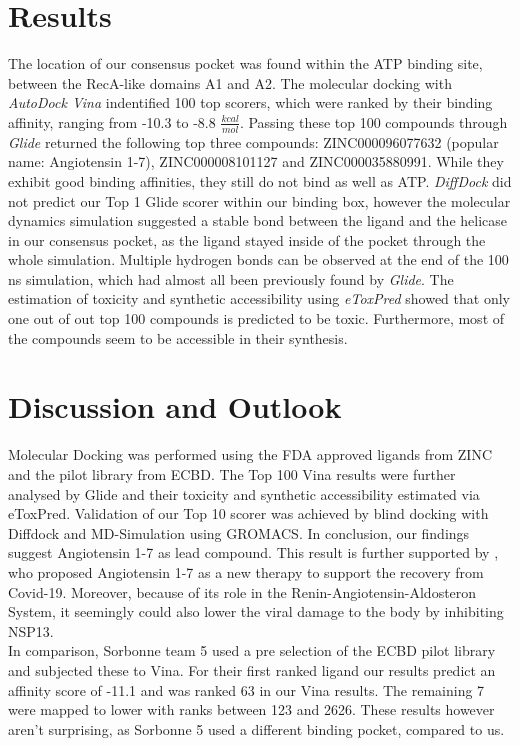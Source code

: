 \documentclass[11pt, letterpaper, titlepage]{article}
\begin{document}
\section{Results}
The location of our consensus pocket was found within the ATP binding site, between the RecA-like domains A1 and A2. The molecular docking with \textit{AutoDock Vina} indentified 100 top scorers, which were ranked by their binding affinity, ranging from -10.3 to -8.8 $\frac{kcal}{mol}$. Passing these top 100 compounds through \textit{Glide} returned the following top three compounds: ZINC000096077632 (popular name: Angiotensin 1-7), ZINC000008101127 and ZINC000035880991. While they exhibit good binding affinities, they still do not bind as well as ATP. \textit{DiffDock} did not predict our Top 1 Glide scorer within our binding box, however the molecular dynamics simulation suggested a stable bond between the ligand and the helicase in our consensus pocket, as the ligand stayed inside of the pocket through the whole simulation. Multiple hydrogen bonds can be observed at the end of the 100 ns simulation, which had almost all been previously found by \textit{Glide}. The estimation of toxicity and synthetic accessibility using \textit{eToxPred} showed that only one out of out top 100 compounds is predicted to be toxic. Furthermore, most of the compounds seem to be accessible in their synthesis.

\FloatBarrier

\section{Discussion and Outlook}
Molecular Docking was performed using the FDA approved ligands from ZINC and the pilot library from ECBD. The Top 100 Vina results were further analysed by Glide and their toxicity and synthetic accessibility estimated via eToxPred. Validation of our Top 10 scorer was achieved by blind docking with Diffdock and MD-Simulation using GROMACS. In conclusion, our findings suggest Angiotensin 1-7 as lead compound. This result is further supported by \textcite{angio}, who proposed Angiotensin 1-7 as a new therapy to support the recovery from Covid-19. Moreover, because of its role in the Renin-Angiotensin-Aldosteron System, it seemingly could also lower the viral damage to the body by inhibiting NSP13.\\

In comparison, Sorbonne team 5 used a pre selection of the ECBD pilot library and subjected these to Vina. For their first ranked ligand our results predict an affinity score of -11.1 and was ranked 63 in our Vina results. The remaining 7 were mapped to lower with ranks between 123 and 2626. These results however aren't surprising, as Sorbonne 5 used a different binding pocket, compared to us.\\


\pagebreak
\FloatBarrier
\renewcommand{\bibname}{References}  %
\printbibliography
\end{document}
